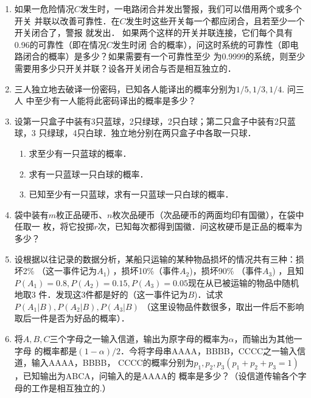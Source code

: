 \documentclass[10pt,a4paper]{article}
\begin{document}
\begin{enumerate}
    \item 如果一危险情况$C$发生时，一电路闭合并发出警报，我们可以借用两个或多个开关
    并联以改善可靠性．在$C$发生时这些开关每一个都应闭合，且若至少一个开关闭合了，警报
    就发出． 如果两个这样的开关并联连接，它们每个具有0.96的可靠性（即在情况$C$发生时闭
    合的概率），问这时系统的可靠性（即电路闭合的概率）是多少？如果需要有一个可靠性至少
    为0.9999的系统，则至少需要用多少只开关并联？设各开关闭合与否是相互独立的．


    \item 三人独立地去破译一份密码，已知各人能译出的概率分别为$1/5,1/3,1/4$. 问三人
    中至少有一人能将此密码译出的概率是多少？


    \item 设第一只盒子中装有3只蓝球，2只绿球，2只白球；第二只盒子中装有2只蓝球，3
    只绿球，4只白球．独立地分别在两只盒子中各取一只球．
    \begin{enumerate}
        \item 求至少有一只蓝球的概率．
        \item 求有一只蓝球一只白球的概率．
        \item 已知至少有一只蓝球，求有一只蓝球一只白球的概率．
    \end{enumerate}


    \item 袋中装有$m$枚正品硬币、$n$枚次品硬币（次品硬币的两面均印有国徽），在袋中任取一
    枚，将它投掷$r$次，已知每次都得到国徽．问这枚硬币是正品的概率为多少？


    \item 设根据以往记录的数据分析，某船只运输的某种物品损坏的情况共有三种：损坏2\%
    （这一事件记为$A_1$) ，损坏10\%（事件$A_2$)，损坏90\% （事件$A_3$) ，且知
    $P(A_1)=0.8,P(A_2)=0.15,P(A_3)=0.05$现在从已被运输的物品中随机地取3
    件．发现这3件都是好的（这一事件记为$B$)．试求$P(A_1|B),P(A_2|B),P(A_3|B)$
     （这里设物品件数很多，取出一件后不影响取后一件是否为好品的概率）．


     \item 将$A,B,C$三个字母之一输入信道，输出为原字母的概率为$\alpha$，而输出为其他一字母
     的概率都是$(1-\alpha)/2$．今将字母串AAAA，BBBB，CCCC之一输入信道，输入AAAA，BBBB，
     CCCC的概率分别为$p_1,p_2,p_3(p_1+p_2+p_3=1)$，已知输出为ABCA，问输入的是AAAA的
     概率是多少？（设信道传输各个字母的工作是相互独立的.）

\end{enumerate}
\end{document}
